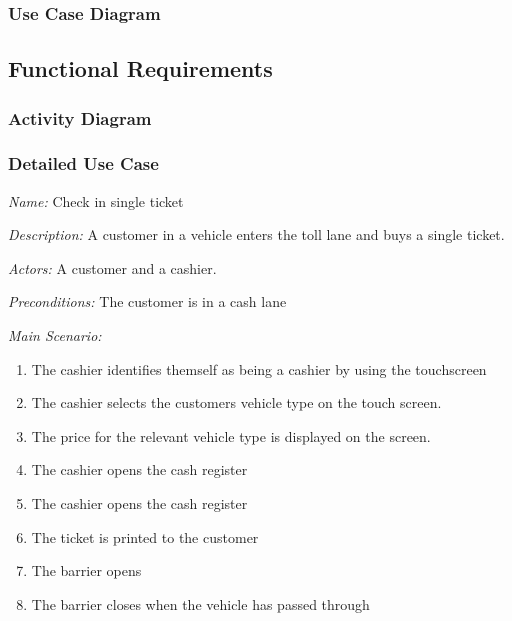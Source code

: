 \subsubsection {Use Case Diagram}

\subsection{Functional Requirements}

\subsubsection{Activity Diagram}

\subsubsection{Detailed Use Case}

\textit {Name: } Check in single ticket

\textit {Description: } A customer in a vehicle enters the toll lane and buys a single ticket.

\textit {Actors: } A customer and a cashier.

\textit {Preconditions: }  The customer is in a cash lane

\textit{Main Scenario: }

\begin{enumerate}
	\item The cashier identifies themself as being a cashier by using the touchscreen
	\item The cashier selects the customers vehicle type on the touch screen.
	\item The price for the relevant vehicle type is displayed on the screen.
	\item The cashier opens the cash register
	\item The cashier opens the cash register
	\item The ticket is printed to the customer
	\item The barrier opens
	\item The barrier closes when the vehicle has passed through
\end{enumerate}

